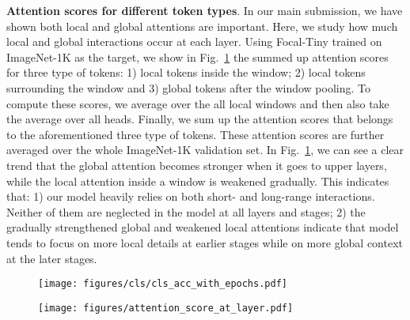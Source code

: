 \documentclass{article}
\begin{document}
\textbf{Attention scores for different token types}. In our main submission, we have shown both local and global attentions are important. Here, we study how much local and global interactions occur at each layer. Using Focal-Tiny trained on ImageNet-1K as the target, we show in Fig.~\ref{fig:local_global_attention_score} the summed up attention scores for three type of tokens: 1) local tokens inside the window; 2) local tokens surrounding the window and 3) global tokens after the window pooling. To compute these scores, we average over the all local windows and then also take the average over all heads. Finally, we sum up the attention scores that belongs to the aforementioned three type of tokens. These attention scores are further averaged over the whole ImageNet-1K validation set. In Fig.~\ref{fig:local_global_attention_score}, we can see a clear trend that the global attention becomes stronger when it goes to upper layers, while the local attention inside a window is weakened gradually. This indicates that: 1) our model heavily relies on both short- and long-range interactions. Neither of them are neglected in the model at all layers and stages; 2) the gradually strengthened global and weakened local attentions indicate that model tends to focus on more local details at earlier stages while on more global context at the later stages.

\begin{figure}[t]
\begin{minipage}{0.48\linewidth}
\centering
\footnotesize
  \texttt{[image: figures/cls/cls\_acc\_with\_epochs.pdf]}
  \label{fig:cls_acc_with_epochs}
  \vspace{-3pt}
\end{minipage}
\hfill
\begin{minipage}{0.48\linewidth}
\centering
\footnotesize
  \texttt{[image: figures/attention\_score\_at\_layer.pdf]}
  \vspace{-3pt}
  \label{fig:local_global_attention_score}
\end{minipage}


\end{figure}
\end{document}
